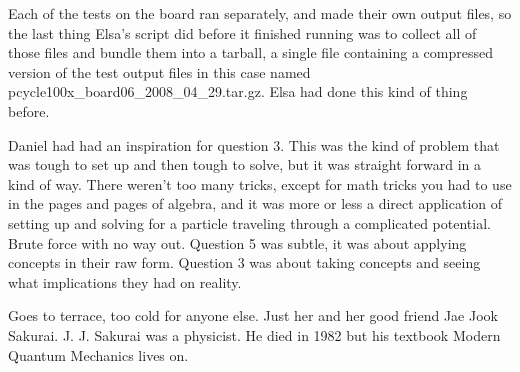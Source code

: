 Each of the tests on the board ran separately, and made their own output files, so the last thing Elsa's script did before it finished running was to collect all of those files and bundle them into a tarball, a single file containing a compressed version of the test output files in this case named {\ttfamily pcycle100x\_board06\_2008\_04\_29.tar.gz}. Elsa had done this kind of thing before. 

\mypause

Daniel had had an inspiration for question 3. This was the kind of problem that was tough to set up and then tough to solve, but it was straight forward in a kind of way. There weren't too many tricks, except for math tricks you had to use in the pages and pages of algebra, and it was more or less a direct application of setting up and solving for a particle traveling through a complicated potential. Brute force with no way out. Question 5 was subtle, it was about applying concepts in their raw form. Question 3 was about taking concepts and seeing what implications they had on reality. 

\mypause

Goes to terrace, too cold for anyone else. Just her and her good friend Jae Jook Sakurai. J. J. Sakurai was a physicist. He died in 1982 but his textbook Modern Quantum Mechanics lives on. 


